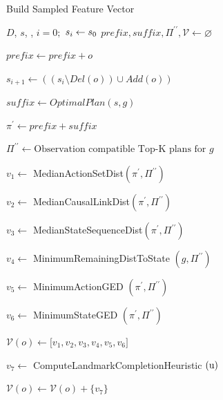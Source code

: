 \begin{algorithm}[ht]
        \caption{Build Sampled Feature Vector}
        \label{alg:apx}
        \begin{algorithmic}[1]
                \Require $D$, $s$, \undesired, \desired
                \State $i=0;$ $ s_{i} \gets s_0$
                \State $prefix,suffix,\Pi^{\prime\prime}, \mathcal{V} \gets \varnothing$
                        \State \parbox[t]{0.95\linewidth}{$prefix \gets prefix + o$}
                        \State \parbox[t]{0.95\linewidth} 
                                {$s_{i+1} \gets ((s_{i} \setminus Del(o))\cup Add(o))$}
                                \State \parbox[t]{0.95\linewidth}{$suffix \gets OptimalPlan(s,g)$}
                                \State \parbox[t]{0.95\linewidth}{$\pi^\prime \gets prefix + suffix$}
                                \State \parbox[t]{0.95\linewidth}{$\Pi^{\prime\prime} \gets \text{Observation compatible Top-K plans for } g$}
                                \State \parbox[t]{0.95\linewidth}{$v_1 \gets$ MedianActionSetDist$(\pi^\prime, \Pi^{\prime\prime})$}
                                \State \parbox[t]{0.95\linewidth}{$v_2 \gets$ MedianCausalLinkDist$(\pi^\prime, \Pi^{\prime\prime})$}
                                \State \parbox[t]{0.95\linewidth}{$v_3 \gets$ MedianStateSequenceDist$(\pi^\prime,\Pi^{\prime\prime})$}
                                \State \parbox[t]{0.95\linewidth}{$v_4 \gets$ MinimumRemainingDistToState $(g,\Pi^{\prime\prime})$}
                                \State \parbox[t]{0.95\linewidth}{$v_5 \gets$ MinimumActionGED $(\pi^\prime, \Pi^{\prime\prime})$}
                                \State \parbox[t]{0.95\linewidth}{$v_6 \gets$ MinimumStateGED $(\pi^\prime, \Pi^{\prime\prime})$}
                                \State $\mathcal{V}(o) \gets \lbrack v_1,v_2,v_3,v_4,v_5,v_6\rbrack $
                        \EndFor
                        \State \parbox[t]{0.95\linewidth}{$v_7 \gets$ ComputeLandmarkCompletionHeuristic $(\mathrm{u})$}
                        \State $\mathcal{V}(o) \gets \mathcal{V}(o)+\{v_7\}$
                \EndFor
                \EndProcedure
        \end{algorithmic}
\end{algorithm}

